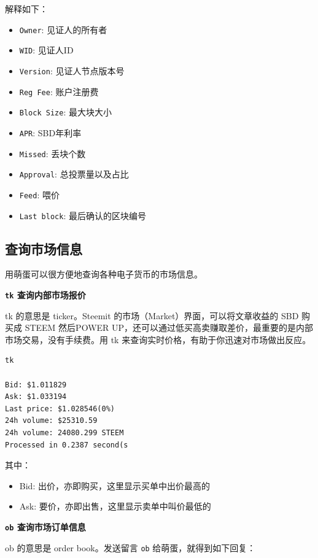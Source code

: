 \documentclass[]{ctexbook}
\begin{document}
解释如下：

\begin{itemize}
\item
  \texttt{Owner}: 见证人的所有者
\item
  \texttt{WID}: 见证人ID
\item
  \texttt{Version}: 见证人节点版本号
\item
  \texttt{Reg\ Fee}: 账户注册费
\item
  \texttt{Block\ Size}: 最大块大小
\item
  \texttt{APR}: SBD年利率
\item
  \texttt{Missed}: 丢块个数
\item
  \texttt{Approval}: 总投票量以及占比
\item
  \texttt{Feed}: 喂价
\item
  \texttt{Last\ block}: 最后确认的区块编号
\end{itemize}

\subsection{查询市场信息}

用萌蛋可以很方便地查询各种电子货币的市场信息。

\textbf{\texttt{tk} 查询内部市场报价}

tk 的意思是 ticker。Steemit 的市场（Market）界面，可以将文章收益的 SBD 购买成 STEEM 然后POWER UP，还可以通过低买高卖赚取差价，最重要的是内部市场交易，没有手续费。用 tk 来查询实时价格，有助于你迅速对市场做出反应。

\begin{verbatim}
tk

Bid: $1.011829
Ask: $1.033194
Last price: $1.028546(0%)
24h volume: $25310.59
24h volume: 24080.299 STEEM
Processed in 0.2387 second(s
\end{verbatim}

其中：

\begin{itemize}
\item
  Bid: 出价，亦即购买，这里显示买单中出价最高的
\item
  Ask: 要价，亦即出售，这里显示卖单中叫价最低的
\end{itemize}

\textbf{\texttt{ob} 查询市场订单信息}

ob 的意思是 order book。发送留言 \texttt{ob} 给萌蛋，就得到如下回复：
\end{document}
